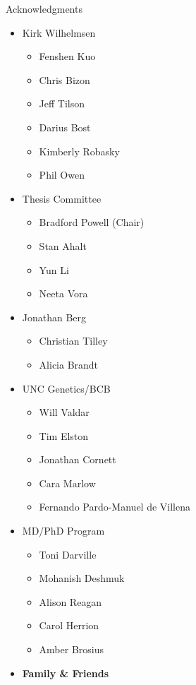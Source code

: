 \documentclass[
  10pt,
  ignorenonframetext,
  m]{beamer}
\begin{document}
\begin{frame}{Acknowledgments}

\begin{minipage}[t]{0.49\linewidth}
\begin{itemize}\scriptsize
  \item Kirk Wilhelmsen
  \begin{itemize}\scriptsize
    \item Fenshen Kuo
    \item Chris Bizon
    \item Jeff Tilson
    \item Darius Bost
    \item Kimberly Robasky
    \item Phil Owen
  \end{itemize}
  \item Thesis Committee
  \begin{itemize}\scriptsize
    \item Bradford Powell (Chair)
    \item Stan Ahalt
    \item Yun Li
    \item Neeta Vora
  \end{itemize}
  \item Jonathan Berg
  \begin{itemize}\scriptsize
    \item Christian Tilley
    \item Alicia Brandt
  \end{itemize}
\end{itemize}
\end{minipage}
\begin{minipage}[t]{0.49\linewidth}
\begin{itemize}\scriptsize
  \item UNC Genetics/BCB
  \begin{itemize}\scriptsize
    \item Will Valdar
    \item Tim Elston
    \item Jonathan Cornett
    \item Cara Marlow
    \item Fernando Pardo-Manuel de Villena
  \end{itemize}
  \item MD/PhD Program
  \begin{itemize}\scriptsize
    \item Toni Darville
    \item Mohanish Deshmuk
    \item Alison Reagan
    \item Carol Herrion
    \item Amber Brosius
  \end{itemize}
  \item \textcolor{uncnavy}{\textbf{Family \& Friends}}
\end{itemize}
\end{minipage}


\end{frame}
\end{document}
